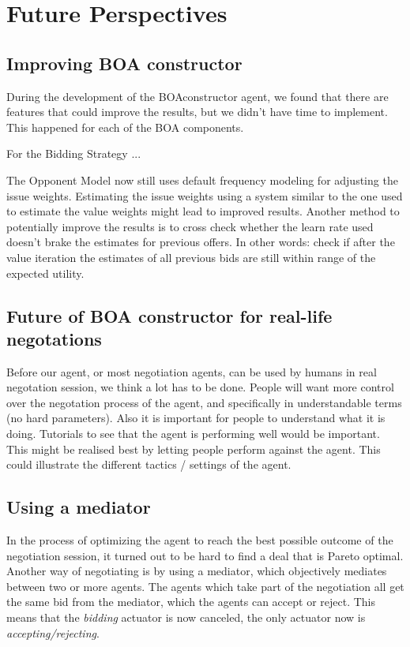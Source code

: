 \section{Future Perspectives}
\subsection{Improving BOA constructor}
During the development of the BOAconstructor agent, we found that there are features that could improve the results, but we didn't have time to implement. This happened for each of the BOA components.

For the Bidding Strategy ...

The Opponent Model now still uses default frequency modeling for adjusting the issue weights. Estimating the issue weights using a system similar to the one used to estimate the value weights might lead to improved results. Another method to potentially improve the results is to cross check whether the learn rate used doesn't brake the estimates for previous offers. In other words: check if after the value iteration the estimates of all previous bids are still within range of the expected utility. 

\subsection{Future of BOA constructor for real-life negotations}

Before our agent, or most negotiation agents, can be used by humans in real negotation 
session, we think a lot has to be done. People will want more control over the 
negotation process of the agent, and specifically in understandable terms (no hard parameters).
Also it is important for people to understand what it is doing. 
Tutorials to see that the agent is performing well would be important. 
This might be realised best by letting people perform against the agent. 
This could illustrate the different tactics / settings of the agent.

\subsection{Using a mediator}
In the process of optimizing the agent to reach the best possible outcome of the negotiation session, it turned out to be hard to find a deal that is Pareto optimal. Another way of negotiating is by using a mediator, which objectively mediates between two or more agents. The agents which take part of the negotiation all get the same bid from the mediator, which the agents can accept or reject. This means that the \textit{bidding} actuator is now canceled, the only actuator now is \textit{accepting/rejecting}.

